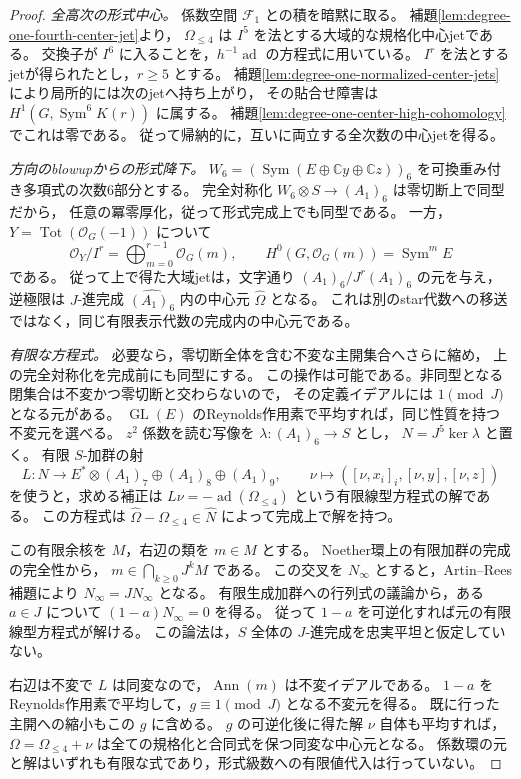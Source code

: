 \begin{proof}
\emph{全高次の形式中心。}
係数空間 $\mathcal F_1$ との積を暗黙に取る。
補題\ref{lem:degree-one-fourth-center-jet}より，
$\Omega_{\le4}$ は $I^5$ を法とする大域的な規格化中心jetである。
交換子が $I^6$ に入ることを，$h^{-1}\operatorname{ad}$ の方程式に用いている。
$I^r$ を法とするjetが得られたとし，$r\ge5$ とする。
補題\ref{lem:degree-one-normalized-center-jets}により局所的には次のjetへ持ち上がり，
その貼合せ障害は
$H^1(G,\operatorname{Sym}^6K(r))$ に属する。
補題\ref{lem:degree-one-center-high-cohomology}でこれは零である。
従って帰納的に，互いに両立する全次数の中心jetを得る。

\emph{方向のblowupからの形式降下。}
$W_6=(\operatorname{Sym}(E\oplus\mathbb Cy\oplus\mathbb Cz))_6$
を可換重み付き多項式の次数6部分とする。
完全対称化 $W_6\otimes S\to(A_1)_6$ は零切断上で同型だから，
任意の冪零厚化，従って形式完成上でも同型である。
一方，$Y=\operatorname{Tot}(\mathcal O_G(-1))$ について
\[
 \mathcal O_Y/I^r=\bigoplus_{m=0}^{r-1}\mathcal O_G(m),\qquad
 H^0(G,\mathcal O_G(m))=\operatorname{Sym}^mE
\]
である。
従って上で得た大域jetは，文字通り $(A_1)_6/J^r(A_1)_6$ の元を与え，
逆極限は $J$-進完成 $\widehat{(A_1)_6}$ 内の中心元 $\widehat\Omega$ となる。
これは別のstar代数への移送ではなく，同じ有限表示代数の完成内の中心元である。

\emph{有限な方程式。}
必要なら，零切断全体を含む不変な主開集合へさらに縮め，
上の完全対称化を完成前にも同型にする。
この操作は可能である。非同型となる閉集合は不変かつ零切断と交わらないので，
その定義イデアルには $1\pmod J$ となる元がある。
$\operatorname{GL}(E)$ のReynolds作用素で平均すれば，同じ性質を持つ不変元を選べる。
$z^2$ 係数を読む写像を $\lambda:(A_1)_6\to S$ とし，
$N=J^5\ker\lambda$ と置く。
有限 $S$-加群の射
\[
 L:N\longrightarrow
       E^*\otimes(A_1)_7\oplus(A_1)_8\oplus(A_1)_9,
 \qquad \nu\longmapsto([\nu,x_i]_i,[\nu,y],[\nu,z])
\]
を使うと，求める補正は
$L\nu=-\operatorname{ad}(\Omega_{\le4})$ という有限線型方程式の解である。
この方程式は $\widehat\Omega-\Omega_{\le4}\in\widehat N$ によって完成上で解を持つ。

この有限余核を $M$，右辺の類を $m\in M$ とする。
Noether環上の有限加群の完成の完全性から，
$m\in\bigcap_{k\ge0}J^kM$ である。
この交叉を $N_\infty$ とすると，Artin--Rees補題により
$N_\infty=JN_\infty$ となる。
有限生成加群への行列式の議論から，ある $a\in J$ について
$(1-a)N_\infty=0$ を得る。
従って $1-a$ を可逆化すれば元の有限線型方程式が解ける。
この論法は，$S$ 全体の $J$-進完成を忠実平坦と仮定していない。

右辺は不変で $L$ は同変なので，$\operatorname{Ann}(m)$ は不変イデアルである。
$1-a$ をReynolds作用素で平均して，$g\equiv1\pmod J$ となる不変元を得る。
既に行った主開への縮小もこの $g$ に含める。
$g$ の可逆化後に得た解 $\nu$ 自体も平均すれば，
$\Omega=\Omega_{\le4}+\nu$ は全ての規格化と合同式を保つ同変な中心元となる。
係数環の元と解はいずれも有限な式であり，形式級数への有限値代入は行っていない。


\end{proof}
